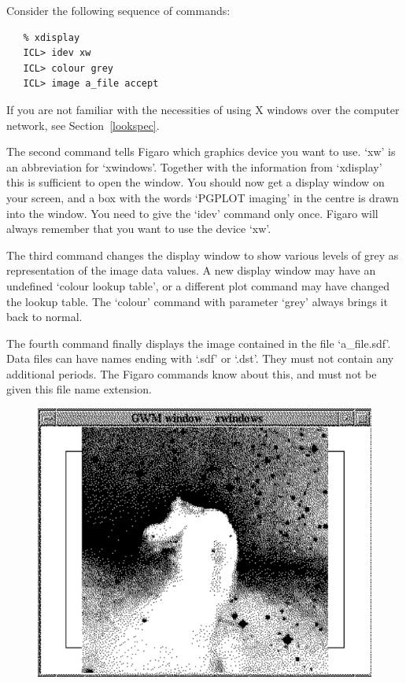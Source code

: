 \documentclass[11pt,twoside]{article}
\newcommand{\htmlref}[2]{#1}
\newcommand{\latorhtm}[2]{#1}
\newcommand{\latorhtm}[2]{#2}
\begin{document}
   Consider the following sequence of commands:

\begin{verbatim}
   % xdisplay
   ICL> idev xw
   ICL> colour grey
   ICL> image a_file accept
\end{verbatim}

   If you are not familiar with the necessities of using X windows over
   the computer network, see
   \latorhtm{Section~\ref{lookspec}.}
   {the section on \htmlref{plotting a spectrum.}{lookspec}}

   The second command tells Figaro which graphics device you want to
   use. `xw' is an abbreviation for `xwindows'. Together with the
   information from `xdisplay' this is sufficient to open the window.
   You should now get a display window on your screen, and a box with
   the words `PGPLOT imaging' in the centre is drawn into the window.
   You need to give the `idev' command only once. Figaro will always
   remember that you want to use the device `xw'.

   The third command changes the display window to show various levels
   of grey as representation of the image data values. A new display
   window may have an undefined `colour lookup table', or a different
   plot command may have changed the lookup table. The `colour'
   command with parameter `grey' always brings it back to normal.

   The fourth command finally displays the image contained in the file
   `a\_file.sdf'. Data files can have names ending with `.sdf' or
   `.dst'. They must not contain any additional periods. The Figaro
   commands know about this, and must not be given this file name
   extension.

\begin{figure}[htb]
\begin{center}
\includegraphics{sun86_imag}
\end{center}
\end{figure}
\end{document}
